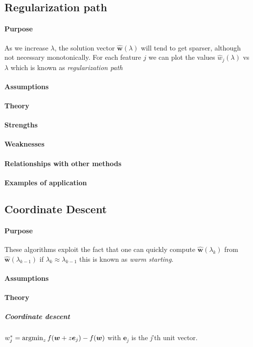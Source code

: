 \subsection{Regularization path}
\paragraph{Purpose}
As we increase $\lambda$, the solution vector $\hat{\bm{w}}(\lambda)$ will tend to get
sparser, although not necessary monotonically. For each feature $j$ we can plot the 
values $\hat{w}_{j}(\lambda)$ vs $\lambda$ which is known as \emph{regularization path}
\paragraph{Assumptions}
\paragraph{Theory}
\paragraph{Strengths}
\paragraph{Weaknesses}
\paragraph{Relationships with other methods}
\paragraph{Examples of application}

\subsection{Coordinate Descent}
\paragraph{Purpose}
These algorithms exploit the fact that one can quickly compute $\hat{\bm{w}}(
\lambda_{k})$ from $\hat{\bm{w}}(\lambda_{k-1})$ if $\lambda_{k} \approx \lambda_{k-1}$
this is known as \emph{warm starting}.
\paragraph{Assumptions}
\paragraph{Theory}
\subparagraph{Coordinate descent}
$w^{*}_{j} = \operatorname*{argmin}_{z}f(\bm{w} + z\bm{e}_{j}) - f(\bm{w})$ with $\bm{e}_{j}$ is the 
\emph{j}'th unit vector. 

